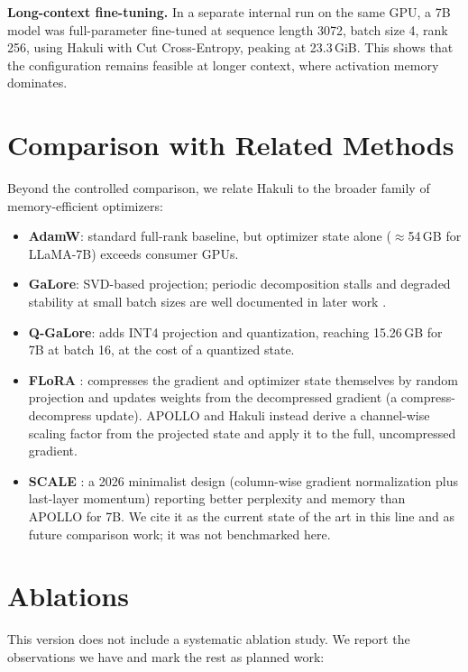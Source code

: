 \documentclass[11pt]{article}
\begin{document}
\textbf{Long-context fine-tuning.} In a separate internal run on the same
GPU, a 7B model was full-parameter fine-tuned at sequence length 3072, batch
size 4, rank 256, using Hakuli with Cut Cross-Entropy, peaking at 23.3\,GiB.
This shows that the configuration remains feasible at longer context, where
activation memory dominates.

\section{Comparison with Related Methods}
\label{sec:comparison}

Beyond the controlled comparison, we relate Hakuli to the broader family of
memory-efficient optimizers:

\begin{itemize}
  \item \textbf{AdamW}: standard full-rank baseline, but optimizer state alone
  ($\approx$54\,GB for LLaMA-7B) exceeds consumer GPUs.
  \item \textbf{GaLore}: SVD-based projection; periodic decomposition stalls
  and degraded stability at small batch sizes are well documented in later
  work \citep{zhu2025apollo}.
  \item \textbf{Q-GaLore}: adds INT4 projection and quantization, reaching
  15.26\,GB for 7B at batch 16, at the cost of a quantized state.
  \item \textbf{FLoRA} \citep{hao2024flora}: compresses the gradient and
  optimizer state themselves by random projection and updates weights from the
  decompressed gradient (a compress-decompress update). APOLLO and Hakuli
  instead derive a channel-wise scaling factor from the projected state and
  apply it to the full, uncompressed gradient.
  \item \textbf{SCALE} \citep{glentis2026scale}: a 2026 minimalist design
  (column-wise gradient normalization plus last-layer momentum) reporting
  better perplexity and memory than APOLLO for 7B. We cite it as the current
  state of the art in this line and as future comparison work; it was not
  benchmarked here.
\end{itemize}

\section{Ablations}
\label{sec:ablations}

This version does not include a systematic ablation study. We report the
observations we have and mark the rest as planned work:
\end{document}
